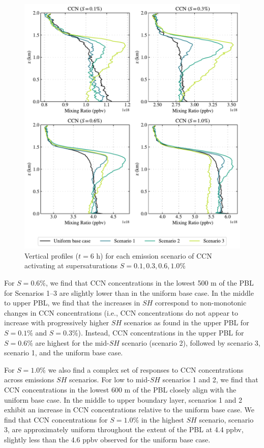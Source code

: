 \begin{figure}[!t]
  \centering
    \includegraphics[width=.9\textwidth]{figures/chapter5/aerosol-ccn-vertical-profiles-time36.pdf}
    \caption{Vertical profiles ($t=6$ h) for each emission scenario of CCN activating at supersaturations $S=0.1, 0.3, 0.6, 1.0$\%}
    \label{fig:ht-ccn-pdiff-s1}
\end{figure}

For $S=0.6\%$, we find that CCN concentrations in the lowest 500 m of the PBL for Scenarios 1--3 are slightly lower than in the uniform base case. In the middle to upper PBL, we find that the increases in $SH$ correspond to non-monotonic changes in CCN concentrations (i.e., CCN concentrations do not appear to increase with progressively higher $SH$ scenarios as found in the upper PBL for $S=0.1\%$ and $S=0.3\%$). Instead, CCN concentrations in the upper PBL for $S=0.6\%$ are highest for the mid-$SH$ scenario (scenario 2), followed by scenario 3, scenario 1, and the uniform base case. 

For $S=1.0\%$ we also find a complex set of responses to CCN concentrations across emissions $SH$ scenarios. For low to mid-$SH$ scenarios 1 and 2, we find that CCN concentrations in the lowest $600$ m of the PBL closely align with the uniform base case. In the middle to upper boundary layer, scenarios 1 and 2 exhibit an increase in CCN concentrations relative to the uniform base case. We find that CCN concentrations for $S=1.0\%$ in the highest $SH$ scenario, scenario 3, are approximately uniform throughout the extent of the PBL at 4.4 ppbv, slightly less than the 4.6 ppbv observed for the uniform base case. 

